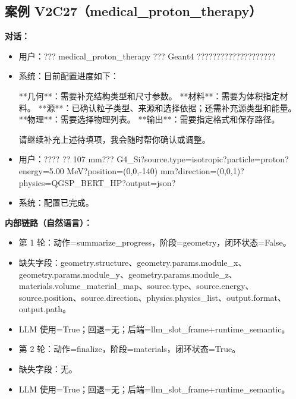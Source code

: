 \documentclass[11pt]{ctexart}
\begin{document}
\subsection{案例 V2C27（medical\_proton\_therapy）}
\textbf{对话：}
\begin{itemize}
\item 用户：??? medical\_proton\_therapy ??? Geant4 ????????????????????
\item 系统：目前配置进度如下：

**几何**：需要补充结构类型和尺寸参数。  
**材料**：需要为体积指定材料。  
**源**：已确认粒子类型、来源和选择依据；还需补充源类型和能量。  
**物理**：需要选择物理列表。  
**输出**：需要指定格式和保存路径。

请继续补充上述待填项，我会随时帮你确认或调整。
\item 用户：???? ?? 107 mm??? G4\_Si?source.type=isotropic?particle=proton?energy=5.00 MeV?position=(0,0,-140) mm?direction=(0,0,1)?physics=QGSP\_BERT\_HP?output=json?
\item 系统：配置已完成。
\end{itemize}
\textbf{内部链路（自然语言）：}
\begin{itemize}
\item 第 1 轮：动作=summarize\_progress，阶段=geometry，闭环状态=False。
\item 缺失字段：geometry.structure、geometry.params.module\_x、geometry.params.module\_y、geometry.params.module\_z、materials.volume\_material\_map、source.type、source.energy、source.position、source.direction、physics.physics\_list、output.format、output.path。
\item LLM 使用=True；回退=无；后端=llm\_slot\_frame+runtime\_semantic。
\item 第 2 轮：动作=finalize，阶段=materials，闭环状态=True。
\item 缺失字段：无。
\item LLM 使用=True；回退=无；后端=llm\_slot\_frame+runtime\_semantic。
\end{itemize}
\end{document}
